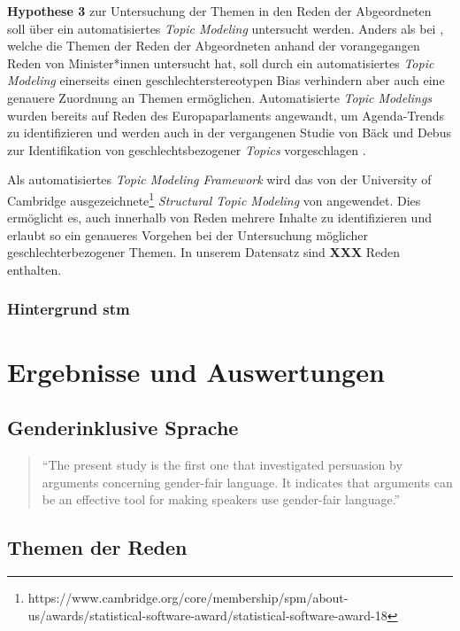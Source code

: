 \documentclass[12pt, 
    twoside=false, 
    bibliography=totoc, 
    numbers=endperiod, 
    headings=normal, 
    toc=chapterentrydotfill
    ]{scrbook}
\begin{document}
\textbf{Hypothese 3} zur Untersuchung der Themen in den Reden der Abgeordneten soll über ein automatisiertes \emph{Topic Modeling} untersucht werden. Anders als bei \textcite{back_2014}, welche die Themen der Reden der Abgeordneten anhand der vorangegangen Reden von Minister*innen untersucht hat, soll durch ein automatisiertes \emph{Topic Modeling} einerseits einen geschlechterstereotypen Bias verhindern aber auch eine genauere Zuordnung an Themen ermöglichen. 
Automatisierte \emph{Topic Modelings} wurden bereits auf Reden des Europaparlaments angewandt, um Agenda-Trends zu identifizieren \parencite[vgl.][]{greene_2016} und werden auch in der vergangenen Studie von Bäck und Debus zur Identifikation von geschlechtsbezogener \emph{Topics} vorgeschlagen \parencite*[18]{back_2018}.

Als automatisiertes \emph{Topic Modeling Framework} wird das von der University of Cambridge ausgezeichnete\footnote{https://www.cambridge.org/core/membership/spm/about-us/awards/statistical-software-award/statistical-software-award-18} \emph{Structural Topic Modeling} von \textcite{roberts_2018} angewendet. Dies ermöglicht es, auch innerhalb von Reden mehrere Inhalte zu identifizieren und erlaubt so ein genaueres Vorgehen bei der Untersuchung möglicher geschlechterbezogener Themen. In unserem Datensatz sind \textbf{XXX} Reden enthalten.

\subsection{Hintergrund stm}

\chapter{Ergebnisse und Auswertungen}

\section{Genderinklusive Sprache}

\begin{quote}
\enquote {The present study is the first one that investigated persuasion by arguments concerning gender-fair language. It indicates that arguments can be an effective tool for making speakers use gender-fair language.} \parencite[556]{koeser_2014}
\end{quote} 

\section{Themen der Reden}
\end{document}
